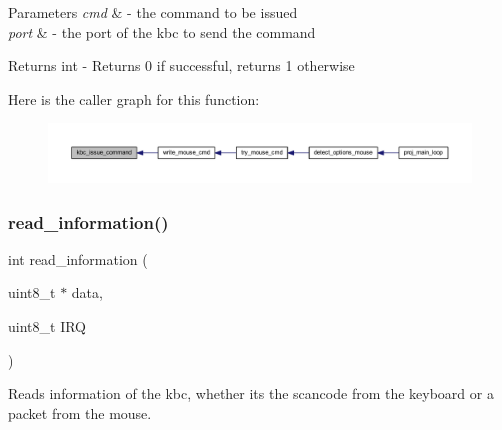 \begin{DoxyParams}{Parameters}
{\em cmd} & -\/ the command to be issued \\
\hline
{\em port} & -\/ the port of the kbc to send the command \\
\hline
\end{DoxyParams}
\begin{DoxyReturn}{Returns}
int -\/ Returns 0 if successful, returns 1 otherwise 
\end{DoxyReturn}
Here is the caller graph for this function\+:
\nopagebreak
\begin{figure}[H]
\begin{center}
\leavevmode
\includegraphics[width=350pt]{group__kbc_ga547e83b3378cd67366e45d3c9565374a_icgraph}
\end{center}
\end{figure}
\mbox{\label{group__kbc_ga51a87bc28290c19518e8bbd5423f508a}} 
\subsubsection{\texorpdfstring{read\+\_\+information()}{read\_information()}}
{\footnotesize\ttfamily int read\+\_\+information (\begin{DoxyParamCaption}\item[{uint8\+\_\+t $\ast$}]{data,  }\item[{uint8\+\_\+t}]{I\+RQ }\end{DoxyParamCaption})}



Reads information of the kbc, whether its the scancode from the keyboard or a packet from the mouse. 



